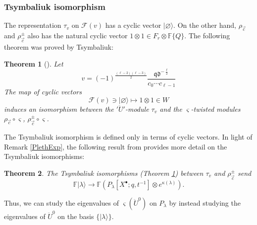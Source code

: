 \documentclass{amsart}
\newcommand{\F}{\mathbb{F}}
\newcommand{\qqq}{\mathfrak{q}}
\newcommand{\ddd}{\mathfrak{d}}
\newcommand{\kb}{\kappa}
\newtheorem{thm}{Theorem}
\theoremstyle{remark}
\numberwithin{thm}{section}
\numberwithin{equation}{section}
\begin{document}
\subsubsection{Tsymbaliuk isomorphism}
The representation $\tau_v$ on $\mathcal{F}(v)$ has a cyclic vector $|\varnothing\rangle$.
On the other hand, $\rho_{\vec{c}}$ and $\rho_{\vec{c}}^\pm$ also has the natural cyclic vector $1\otimes 1\in F_r\otimes \F\{Q\}$.
The following theorem was proved by Tsymbaliuk:
\begin{thm}[\cite{T}]\label{TsymIso}
Let
\begin{equation}
v=(-1)^{\frac{(\ell-2)(\ell-3)}{2}}\frac{\qqq\ddd^{-\frac{\ell}{2}}}{c_0\cdots c_{\ell-1}}
\label{FockVertexPar}
\end{equation}
The map of cyclic vectors
\[
\mathcal{F}(v)\ni|\varnothing\rangle\mapsto 1\otimes 1\in W
\]
induces an isomorphism between the $'\ddot{U}'$-module $\tau_v$ and the $\varsigma$-twisted modules $\rho_{\vec{c}}\circ\varsigma$, $\rho_{\vec{c}}^\pm\circ\varsigma$.
\end{thm}
\noindent The Tsymbaliuk isomorphism is defined only in terms of cyclic vectors.
In light of Remark \ref{PlethExp}, the following result from \cite{Wen} provides more detail on the Tsymbaliuk isomorphisms:
\begin{thm}
The Tsymbaliuk isomorphisms (Theorem \ref{TsymIso}) between $\tau_v$ and $\rho_{\vec{c}}^\pm$ send 
\[\F|\lambda\rangle\to\F \left(P_\lambda[X^\bullet;q,t^{-1}]\otimes e^{\kb(\lambda)}\right).\]
\end{thm}
\noindent Thus, we can study the eigenvalues of $\varsigma(\ddot{U}^0)$ on $P_\lambda$ by instead studying the eigenvalues of $\ddot{U}^0$ on the basis $\{|\lambda\rangle\}$.
\end{document}
